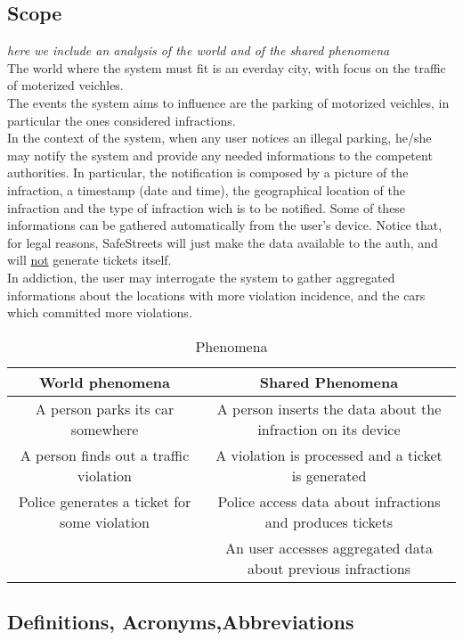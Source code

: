 \documentclass{article}
\begin{document}
	\subsection{Scope} \textit{here we include an analysis of the world and of the shared phenomena}\\
	The world where the system must fit is an everday city, with focus on the traffic of moterized veichles.\\
	The events the system aims to influence are the parking of motorized veichles,  in particular the ones considered infractions.\\
	In the context of the system, when any user notices an illegal parking, he/she may notify the system and provide any needed informations to the competent authorities. In particular, the notification is composed by a picture of the infraction, a timestamp (date and time), the geographical location of the infraction and the type of infraction wich is to be notified. Some of these informations can be gathered automatically from the user's device. Notice that, for legal reasons, SafeStreets will just make the data available to the auth, and will \underline{not} generate tickets itself. \\
	In addiction, the user may interrogate the system to gather aggregated informations about the locations with more violation incidence, and the cars which committed more violations. 
		\begin{table}[h]
			\begin{center}
				\caption{Phenomena}
				\label{Phenomena}
				\begin{tabular}{c|c}
					\textbf{World phenomena}&\textbf{Shared Phenomena}\\
					\hline
					A person parks its car somewhere&A person inserts the data about the infraction on its device\\
					A person finds out a traffic violation&A violation is processed and a ticket is generated\\
					Police generates a ticket for some violation&Police access data about infractions and produces tickets\\
					&An user accesses aggregated data about previous infractions
				\end{tabular}
			\end{center}
		\end{table}
	\subsection{Definitions, Acronyms,Abbreviations} \label{definitions}
\end{document}
